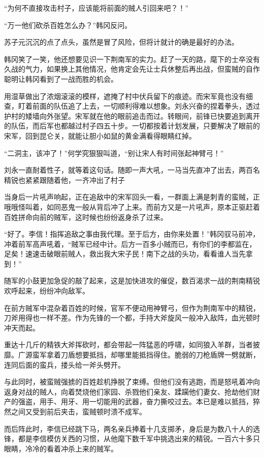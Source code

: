 “为何不直接攻击村子，应该能将前面的贼人引回来吧？！”

“万一他们砍杀百姓怎么办？”韩冈反问。

苏子元沉沉的点了点头，虽然是冒了风险，但将计就计的确是最好的办法。

韩冈笑了一笑，他还想要见识一下荆南军的实力。赶了一天的路，麾下的士卒没有久战的气力，如果换上其他情况，他肯定会先让士兵休整后再出战，但蛮贼的自作聪明让韩冈看到了一战而胜的机会。

用湿草做出了浓烟滚滚的模样，遮掩了村中伏兵留下的痕迹。而宋军竟也没有细查，盯着前面的队伍追了上去，一切顺利得难以想象。刘永兴奋的捏着拳头，透过护村的矮墙向外张望。宋军就在他的眼前追击而过。转眼间，前锋已快要追到离开的队伍，而后军也都越过村子四五十步。一切都按着计划发展，只要解决了眼前的宋军，回到昆仑关，就能让胆小如鼠的黄金满看得眼睛红掉。

“二洞主，该冲了！”何学究狠狠叫道，“别让宋人有时间张起神臂弓！”

刘永一直耐着性子，就等着这句话。随即一声大吼，一马当先直冲了出去，两百名精锐也紧紧跟随着他，一齐冲出了村子

当身后一片吼声响起，正在追敌中的宋军回头一看，一群面上满是刺青的蛮贼，正哦哦怪叫着，如同恶鬼一般从背后冲了上来。而前方又是一片吼声，原本正驱赶着百姓拼命向前的贼军，这时候也纷纷返身杀了过来。

“好了。李信！指挥追敌之事由我代理。至于后方，由你来处置！”韩冈驭马前冲，冲着前军高声吼着，“贼军已经中计。后方一百多小贼而已，有你们的李都监在，足矣！速速击破眼前贼人，救出我大宋子民！南下之战的头功，看看谁人当先拿到！”

随军的小鼓更加急促的敲了起来，这是加快进攻的催促，数百渴求一战的荆南精锐欢呼起来，纷纷冲向敌军。

在前方贼军中混杂着百姓的时候，官军不便动用神臂弓，但作为荆南军中的精锐，刀斧用得也一样不差。作为先锋的一个都，手持大斧旋风一般冲入敌阵，血光顿时冲天而起。

重达十几斤的精铁大斧挥砍时，都会带起一阵猛恶的呼啸，如同狼入羊群，当者披靡。广源蛮军拿着刀盾想要抵挡，却哪里能抵挡得住。脆弱的刀枪盾牌一劈就断，连同后面的蛮兵，搂头给一斧头劈开。

与此同时，被蛮贼强掳的百姓趁机挣脱了束缚。但他们没有逃跑，而是怒吼着冲向返身对战的贼人，向着焚烧他们家园、杀戮他们亲友、蹂躏他们妻女、抢劫他们财产的强盗，用手、用牙、用一切能用的武器，奋力撕咬过去。本已是难以抵挡，猝然之间又受到前后夹击，蛮贼顿时溃不成军。

而后阵此时，李信已经跳下马，两名亲兵捧着十几支掷矛，身后是为数八十人的选锋，都是李信模仿关西的习惯，从他麾下数千军中挑选出来的精锐。一百六十多只眼睛，冷冷的看着冲杀上来的贼军。

